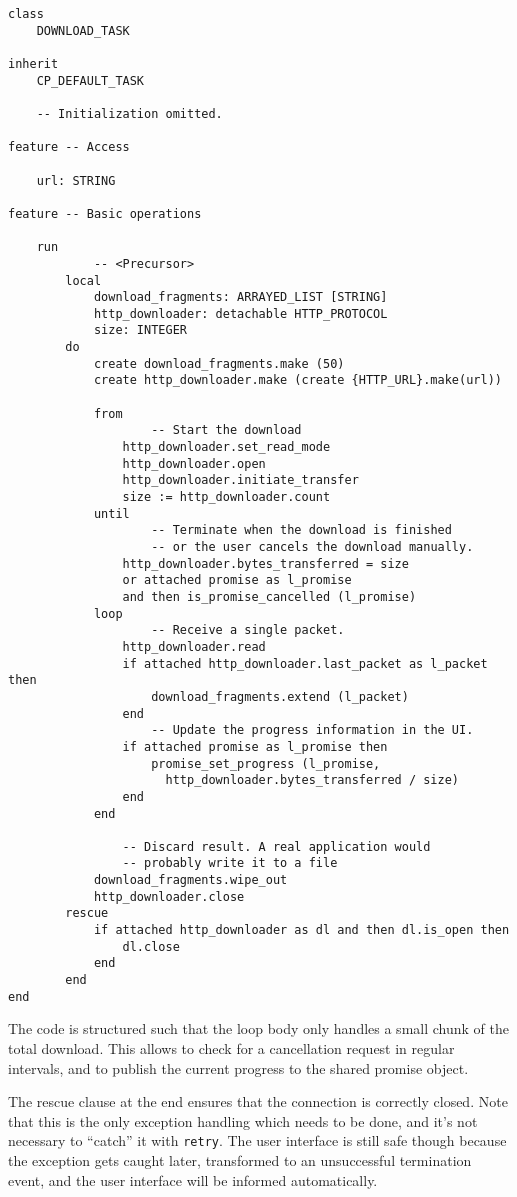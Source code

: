 \begin{lstlisting}[language=OOSC2Eiffel, label={code:download-task}, captionpos=b, caption={The background download task.}]
class
	DOWNLOAD_TASK

inherit
	CP_DEFAULT_TASK

    -- Initialization omitted.

feature -- Access

	url: STRING

feature -- Basic operations

	run
			-- <Precursor>
		local
			download_fragments: ARRAYED_LIST [STRING]
			http_downloader: detachable HTTP_PROTOCOL
			size: INTEGER
		do
			create download_fragments.make (50)
			create http_downloader.make (create {HTTP_URL}.make(url))

			from
					-- Start the download
				http_downloader.set_read_mode
				http_downloader.open
				http_downloader.initiate_transfer
				size := http_downloader.count
			until
					-- Terminate when the download is finished 
					-- or the user cancels the download manually.
				http_downloader.bytes_transferred = size 
				or attached promise as l_promise 
				and then is_promise_cancelled (l_promise)
			loop
					-- Receive a single packet.
				http_downloader.read
				if attached http_downloader.last_packet as l_packet then
					download_fragments.extend (l_packet)
				end
					-- Update the progress information in the UI.
				if attached promise as l_promise then
					promise_set_progress (l_promise, 
					  http_downloader.bytes_transferred / size)
				end
			end

				-- Discard result. A real application would
				-- probably write it to a file
			download_fragments.wipe_out
			http_downloader.close
		rescue
			if attached http_downloader as dl and then dl.is_open then
				dl.close
			end
		end
end
\end{lstlisting}

The code is structured such that the loop body only handles a small chunk of the total download.
This allows to check for a cancellation request in regular intervals, and to publish the current progress to the shared promise object.

The rescue clause at the end ensures that the connection is correctly closed.
Note that this is the only exception handling which needs to be done, and it's not necessary to ``catch'' it with \lstinline!retry!.
The user interface is still safe though because the exception gets caught later, transformed to an unsuccessful termination event, and the user interface will be informed automatically.

